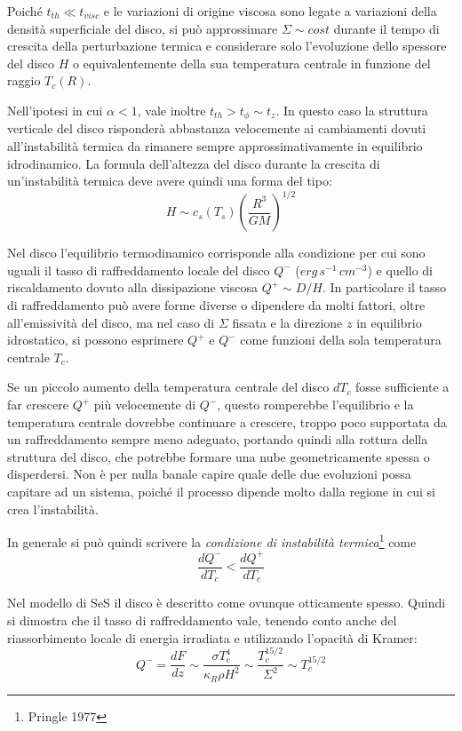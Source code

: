 \documentclass[a4paperbi]{article}
\begin{document}
	Poiché $t_{th}\ll t_{visc}$ e le variazioni di origine viscosa sono legate a variazioni della densità superficiale del disco, si può approssimare $\Sigma\sim cost$ durante il tempo di crescita della perturbazione termica e considerare solo l'evoluzione dello spessore del disco $H$ o equivalentemente della sua temperatura centrale in funzione del raggio $T_c(R)$.
	
	Nell'ipotesi in cui $\alpha<1$, vale inoltre $t_{th}>t_\phi\sim t_z$. In questo caso la struttura verticale del disco risponderà abbastanza velocemente ai cambiamenti dovuti all'instabilità termica da rimanere sempre approssimativamente in equilibrio idrodinamico. La formula dell'altezza del disco durante la crescita di un'instabilità termica deve avere quindi una forma del tipo: 
	\begin{equation*}
		H\sim c_s(T_s)\left(\frac{R^3}{GM}\right)^{1/2}
	\end{equation*}
	
	Nel disco l'equilibrio termodinamico corrisponde alla condizione per cui sono uguali il tasso di raffreddamento locale del disco $Q^-$ ($erg\,s^{-1}\,cm^{-3}$) e quello di riscaldamento dovuto alla dissipazione viscosa $Q^+\sim D/H$. In particolare il tasso di raffreddamento può avere forme diverse o dipendere da molti fattori, oltre all'emissività del disco, ma nel caso di $\Sigma$ fissata e la direzione $z$ in equilibrio idrostatico, si possono esprimere $Q^+$ e $Q^-$ come funzioni della sola temperatura centrale $T_c$. 
	
	Se un piccolo aumento della temperatura centrale del disco $dT_c$ fosse sufficiente a far crescere $Q^+$ più velocemente di $Q^-$, questo romperebbe l'equilibrio e la temperatura centrale dovrebbe continuare a crescere, troppo poco supportata da un raffreddamento sempre meno adeguato, portando quindi alla rottura della struttura del disco, che potrebbe formare una nube geometricamente spessa o disperdersi. Non è per nulla banale capire quale delle due evoluzioni possa capitare ad un sistema, poiché il processo dipende molto dalla regione in cui si crea l'instabilità.
	
	In generale si può quindi scrivere la \textit{condizione di instabilità termica}\footnote{Pringle 1977} come
	\begin{equation}
		\frac{dQ^-}{dT_c}<\frac{dQ^+}{dT_c}
	\end{equation}

	Nel modello di SeS il disco è descritto come ovunque otticamente spesso. Quindi si dimostra che il tasso di raffreddamento vale, tenendo conto anche del riassorbimento locale di energia irradiata e utilizzando l'opacità di Kramer:
	\begin{equation}
		Q^-=\frac{dF}{dz}\sim\frac{\sigma T_c^4}{\kappa_R\rho H^2}\sim\frac{T_c^{15/2}}{\Sigma^2}\sim T_c^{15/2}
	\end{equation}
	
\end{document}
